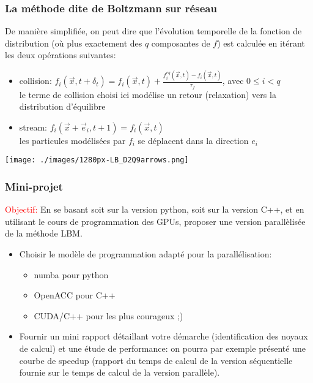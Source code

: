 \documentclass[utf8,usenames,dvipsnames,hyperref={pdfpagemode=FullScreen,urlcolor=blue}]{beamer}
\begin{document}
\begin{frame}
  \frametitle{La méthode dite de Boltzmann sur réseau}

  \begin{minipage}{0.66\linewidth}
    De manière simplifiée, on peut dire que l'évolution temporelle de la fonction de distribution (où plus exactement des $q$ composantes de $f$) est calculée en itérant les deux opérations suivantes:

    \begin{itemize}
    \item collision: $f_i(\vec{x},t+\delta_t) = f_i(\vec{x},t) + \frac{f_i^{eq}(\vec{x},t)-f_i(\vec{x},t)}{\tau_f}$, avec $ 0 \leq i < q$\\
      le terme de collision choisi ici modélise un retour (relaxation) vers la distribution d'équilibre 
    \item stream: $f_i(\vec{x}+\vec{e}_i,t+1) =f_i(\vec{x},t)$\\
      les particules modélisées par $f_{i}$ se déplacent dans la direction $e_{i}$
    \end{itemize}

  \end{minipage}
  \begin{minipage}{0.33\linewidth}
    \texttt{[image: ./images/1280px-LB\_D2Q9arrows.png]}
  \end{minipage}

\end{frame}

\begin{frame}
  \frametitle{Mini-projet}

  \textcolor{red}{Objectif:} En se basant soit sur la version python, soit sur la version C++, et en utilisant le cours de programmation des GPUs, proposer une version parallèlisée de la méthode LBM.

  \begin{itemize}
  \item Choisir le modèle de programmation adapté pour la parallélisation:
    \begin{itemize}
    \item numba pour python
    \item OpenACC pour C++
    \item CUDA/C++ pour les plus courageux ;)
    \end{itemize}
  \item Fournir un mini rapport détaillant votre démarche (identification des noyaux de calcul) et une étude de performance: on pourra par exemple présenté une courbe de speedup (rapport du temps de calcul de la version séquentielle fournie sur le temps de calcul de la version parallèle).
  \end{itemize}


\end{frame}
\end{document}
